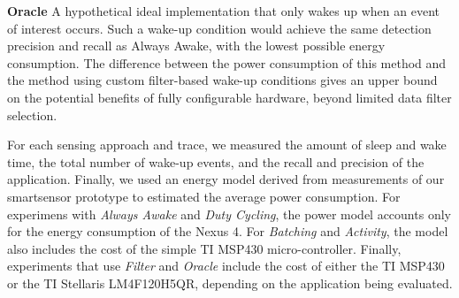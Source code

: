 \textbf{Oracle} A hypothetical ideal implementation that only wakes up
when an event of interest occurs.  Such a wake-up condition would
achieve the same detection precision and recall as Always Awake, with
the lowest possible energy consumption. The difference between the
power consumption of this method and the method using custom
filter-based wake-up conditions gives an upper bound on the potential
benefits of fully configurable hardware, beyond limited data filter
selection.

For each sensing approach and trace, we measured the amount of sleep
and wake time, the total number of wake-up events, and the recall and
precision of the application.  Finally, we used an energy model
derived from measurements of our smartsensor prototype to estimated
the average power consumption.  For experimens with {\em Always Awake}
and {\em Duty Cycling}, the power model accounts only for the energy
consumption of the Nexus 4.  For {\em Batching} and {\em Activity},
the model also includes the cost of the simple TI MSP430
micro-controller.  Finally, experiments that use {\em Filter} and {\em
  Oracle} include the cost of either the TI MSP430 or the TI Stellaris
LM4F120H5QR, depending on the application being evaluated.








